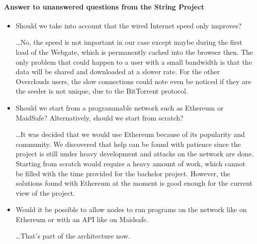 \paragraph{Answer to unanswered questions from the String Project}
\begin{itemize}
\item Should we take into account that the wired Internet speed only improves?

\dots No, the speed is not important in our case except maybe during the first load of the Webgate, which is permanently cached into the browser then. The only problem that could happen to a user with a small bandwidth is that the data will be shared and downloaded at a slower rate. For the other Overclouds users, the slow connections could note even be noticed if they are the seeder is not unique, due to the BitTorrent protocol.

\item Should we start from a programmable network such as Ethereum or MaidSafe? Alternatively, should we start from scratch?

\dots It was decided that we would use Ethereum because of its popularity and community. We discovered that help can be found with patience since the project is still under heavy development and attacks on the network are done. Starting from scratch would require a heavy amount of work, which cannot be filled with the time provided for the bachelor project. However, the solutions found with Ethereum at the moment is good enough for the current view of the project. 

\item Would it be possible to allow nodes to run programs on the network like on Ethereum or with an API like on Maidsafe\cite{MaidSafe2014MaidSafe.netCommunity}.

\dots That's part of the architecture now.

\end{itemize}

